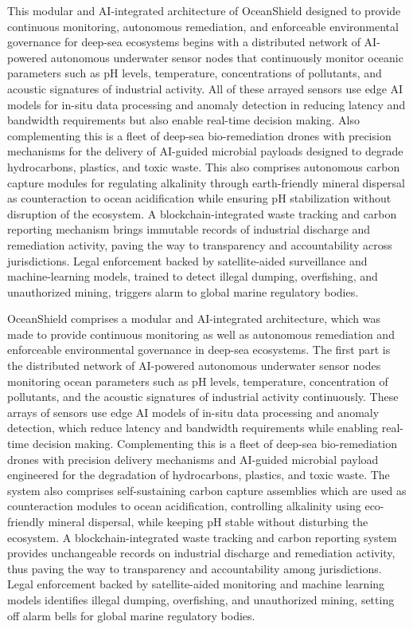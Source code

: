 \documentclass[a4paper]{article}
\begin{document}
This modular and AI-integrated architecture of OceanShield designed to provide continuous monitoring, autonomous remediation, and enforceable environmental governance for deep-sea ecosystems begins with a distributed network of AI-powered autonomous underwater sensor nodes that continuously monitor oceanic parameters such as pH levels, temperature, concentrations of pollutants, and acoustic signatures of industrial activity. All of these arrayed sensors use edge AI models for in-situ data processing and anomaly detection in reducing latency and bandwidth requirements but also enable real-time decision making. Also complementing this is a fleet of deep-sea bio-remediation drones with precision mechanisms for the delivery of AI-guided microbial payloads designed to degrade hydrocarbons, plastics, and toxic waste. This also comprises autonomous carbon capture modules for regulating alkalinity through earth-friendly mineral dispersal as counteraction to ocean acidification while ensuring pH stabilization without disruption of the ecosystem. A blockchain-integrated waste tracking and carbon reporting mechanism brings immutable records of industrial discharge and remediation activity, paving the way to transparency and accountability across jurisdictions. Legal enforcement backed by satellite-aided surveillance and machine-learning models, trained to detect illegal dumping, overfishing, and unauthorized mining, triggers alarm to global marine regulatory bodies.

OceanShield comprises a modular and AI-integrated architecture, which was made to provide continuous monitoring as well as autonomous remediation and enforceable environmental governance in deep-sea ecosystems. The first part is the distributed network of AI-powered autonomous underwater sensor nodes monitoring ocean parameters such as pH levels, temperature, concentration of pollutants, and the acoustic signatures of industrial activity continuously. These arrays of sensors use edge AI models of in-situ data processing and anomaly detection, which reduce latency and bandwidth requirements while enabling real-time decision making. Complementing this is a fleet of deep-sea bio-remediation drones with precision delivery mechanisms and AI-guided microbial payload engineered for the degradation of hydrocarbons, plastics, and toxic waste. The system also comprises self-sustaining carbon capture assemblies which are used as counteraction modules to ocean acidification, controlling alkalinity using eco-friendly mineral dispersal, while keeping pH stable without disturbing the ecosystem. A blockchain-integrated waste tracking and carbon reporting system provides unchangeable records on industrial discharge and remediation activity, thus paving the way to transparency and accountability among jurisdictions. Legal enforcement backed by satellite-aided monitoring and machine learning models identifies illegal dumping, overfishing, and unauthorized mining, setting off alarm bells for global marine regulatory bodies.
\end{document}
